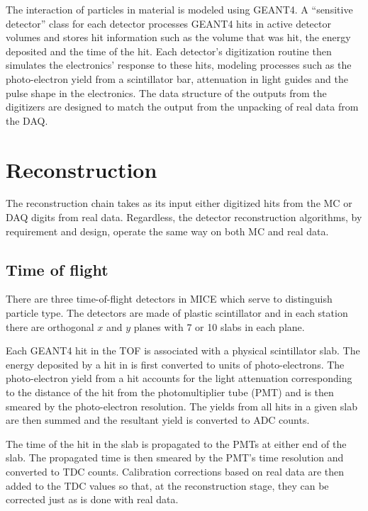 \documentclass{JINST}
\begin{document}
The interaction of particles in material is modeled using GEANT4. A ``sensitive detector'' class for each detector processes GEANT4 hits in active detector volumes and stores  hit information such as the volume that was hit, the energy deposited and the time of the hit. Each detector's digitization routine then simulates the electronics' response to these hits, modeling processes such as the photo-electron yield from a scintillator bar, attenuation in light guides and the pulse shape in the electronics. The data structure of the outputs from the digitizers are designed to match the output from the unpacking of real data from the DAQ.


\section{Reconstruction}\label{sec:recon}
The reconstruction chain takes as its input either digitized hits from the MC or DAQ digits from real data. Regardless, the detector reconstruction algorithms, by requirement and design, operate the same way on both MC and real data. 
%

\subsection{Time of flight}

There are three time-of-flight detectors in MICE which serve to distinguish particle type. The detectors are made of plastic scintillator and in each station there are orthogonal $x$ and $y$ planes with 7 or 10 slabs in each plane. 

Each GEANT4 hit in the TOF is associated with a physical scintillator slab. The energy deposited by a hit in is first converted to units of photo-electrons. The photo-electron yield from a hit accounts for the light attenuation corresponding to the distance of the hit from the photomultiplier tube (PMT) and is then smeared by the photo-electron resolution. The yields from all hits in a given slab are then summed and the resultant yield is converted to ADC counts.

The time of the hit in the slab is propagated to the PMTs at either end of the slab. The propagated time is then smeared by the PMT's time resolution and converted to TDC counts. Calibration corrections based on real data are then added to the TDC values so that, at the reconstruction stage, they can be corrected just as is done with real data.
\end{document}

